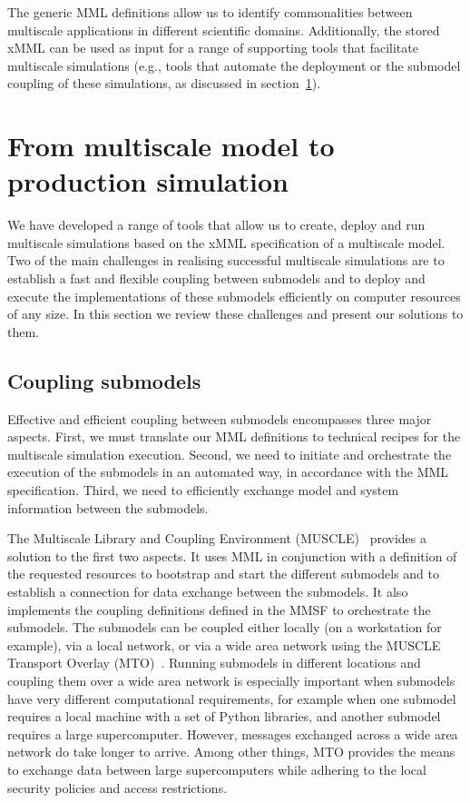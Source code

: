 \documentclass[a4,10pt]{article}
\begin{document}
The generic MML definitions allow us to identify commonalities between
multiscale applications in different scientific domains. Additionally, the
stored xMML can be used as input for a range of supporting tools that facilitate
multiscale simulations (e.g., tools that automate the deployment or
the submodel coupling of these simulations, as discussed in
section~\ref{Sec:MAPPER}). 

\section{From multiscale model to production simulation}\label{Sec:MAPPER}

We have developed a range of tools that allow us to create, deploy and run
multiscale simulations based on the xMML specification of a multiscale model.
Two of the main challenges in realising successful multiscale simulations
are to establish a fast and flexible coupling between submodels and to deploy
and execute the implementations of these submodels efficiently on computer
resources of any size. In this section we review these challenges and present
our solutions to them. 

\subsection{Coupling submodels}

Effective and efficient coupling between submodels encompasses three
major aspects. First, we must translate our MML definitions to technical recipes
for the multiscale simulation execution.  Second, we need to
initiate and orchestrate the execution of the submodels in an automated way,
in accordance with the MML specification. Third, we need to 
efficiently exchange model and system information between the submodels. 

The Multiscale Library and Coupling Environment
(MUSCLE)~\cite{Hegewald:2008,Borgdorff:2012} provides a solution to the first
two aspects. It uses MML in conjunction with a definition of the requested
resources to bootstrap and start the different submodels and to establish a
connection for data exchange between the submodels. It also implements the
coupling definitions defined in the MMSF to orchestrate the submodels. The
submodels can be coupled either locally (on a workstation for example), via a local
network, or via a wide area network using the MUSCLE Transport Overlay
(MTO)~\cite{Zasada:2012}. Running submodels in different locations and coupling
them over a wide area network is especially important when submodels have
very different computational requirements, for example when one submodel
requires a local machine with a set of Python libraries, and another submodel
requires a large supercomputer. However, messages exchanged across a wide 
area network do take longer to arrive. Among other things, MTO provides the means to
exchange data between large supercomputers while adhering to the local security
policies and access restrictions.
\end{document}
